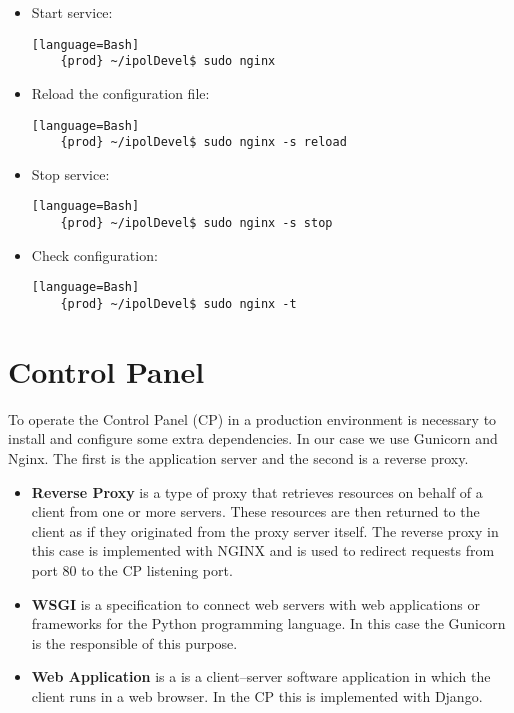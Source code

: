 \documentclass[a4paper,12pt]{article}
\begin{document}
\begin{itemize}
    \item Start service:
    \begin{verbatim}[language=Bash]
    {prod} ~/ipolDevel$ sudo nginx
    \end{verbatim}
    \item Reload the configuration file:
    \begin{verbatim}[language=Bash]
    {prod} ~/ipolDevel$ sudo nginx -s reload
    \end{verbatim}
    \item Stop service:
    \begin{verbatim}[language=Bash]
    {prod} ~/ipolDevel$ sudo nginx -s stop
    \end{verbatim}
    \item Check configuration:
    \begin{verbatim}[language=Bash]
    {prod} ~/ipolDevel$ sudo nginx -t
    \end{verbatim}
\end{itemize}


\section{Control Panel}
To operate the Control Panel (CP) in a production environment is necessary to install and configure some extra dependencies. In our case we use Gunicorn and Nginx. The first is the application server and the second is a reverse proxy.

\begin{itemize}
    \item \textbf{Reverse Proxy} is a type of proxy that retrieves resources on behalf of a client from one or more servers.
    These resources are then returned to the client as if they originated from the proxy server itself. The reverse proxy in this case is
    implemented with NGINX and is used to redirect requests from port 80 to the CP listening port.
    \item \textbf{WSGI} is a specification to connect web servers with web applications or frameworks for the Python programming language.
    In this case the Gunicorn is the responsible of this purpose.
    \item \textbf{Web Application} is a is a client–server software application in which the client runs in a web browser. In the CP this
    is implemented with Django.
\end{itemize}
\end{document}
